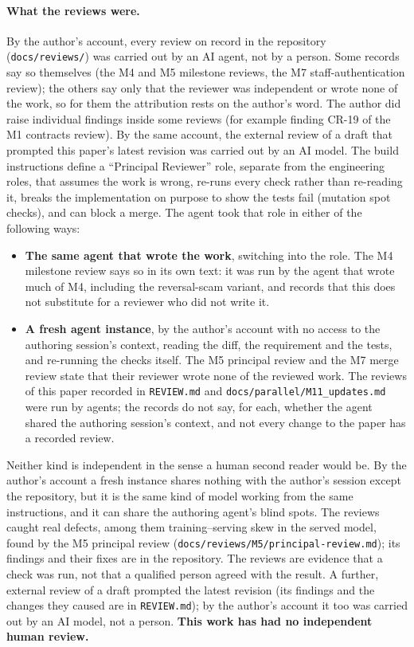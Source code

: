 \paragraph{What the reviews were.} By the author's account, every review on record in the
repository (\texttt{docs/reviews/}) was carried out by an AI agent, not by a person. Some records say so themselves (the M4 and M5 milestone reviews, the M7
staff-authentication review); the others say only that the reviewer was independent or wrote none of
the work, so for them the attribution rests on the author's word. The author did raise individual
findings inside some reviews (for example finding CR-19 of the M1 contracts review). By the same
account, the external review of a draft that prompted this paper's latest revision was carried out by
an AI model. The build
instructions define a ``Principal Reviewer'' role, separate from the engineering roles, that assumes
the work is wrong, re-runs every check rather than re-reading it, breaks the implementation on
purpose to show the tests fail (mutation spot checks), and can block a merge. The agent took that
role in either of the following ways:
\begin{itemize}
  \item \textbf{The same agent that wrote the work}, switching into the role. The M4 milestone review
  says so in its own text: it was run by the agent that wrote much of M4, including the reversal-scam
  variant, and records that this does not substitute for a reviewer who did not write it.
  \item \textbf{A fresh agent instance}, by the author's account with no access to the authoring
  session's context, reading the
  diff, the requirement and the tests, and re-running the checks itself. The M5 principal review and
  the M7 merge review state that their reviewer wrote none of the reviewed work. The reviews of this
  paper recorded in \texttt{REVIEW.md} and \texttt{docs/parallel/M11\_updates.md} were run by
  agents; the records do not say, for each, whether the agent shared the authoring session's
  context, and not every change to the paper has a recorded review.
\end{itemize}
Neither kind is independent in the sense a human second reader would be. By the author's account a fresh
instance shares nothing with the author's session except the repository, but it is the same kind of model working
from the same instructions, and it can share the authoring agent's blind spots. The reviews caught
real defects, among them training--serving skew in the served model, found by the M5 principal
review (\texttt{docs/reviews/M5/principal-review.md}); its findings and their fixes are in the
repository. The reviews are evidence that a check was run, not that a qualified person agreed with
the result. A further, external review of a draft prompted the latest revision (its findings and
the changes they caused are in \texttt{REVIEW.md}); by the author's account it too was carried out by
an AI model, not a person. \textbf{This work has had no independent human review.}

